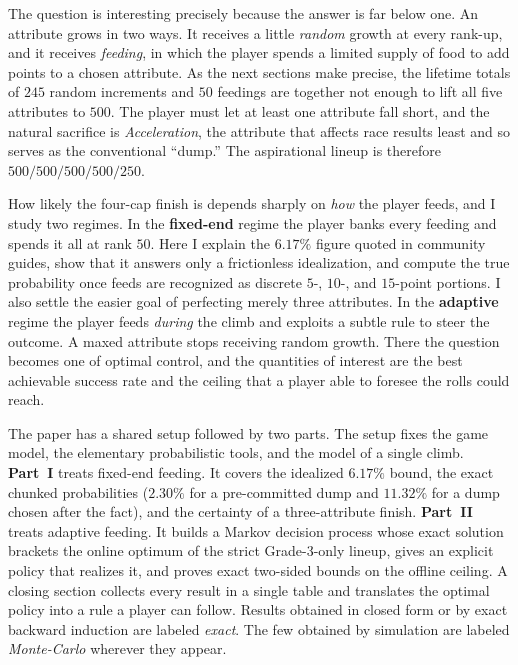 \documentclass[11pt]{article}
\theoremstyle{remark}
\begin{document}
The question is interesting precisely because the answer is far below one. An
attribute grows in two ways. It receives a little \emph{random} growth at every
rank-up, and it receives \emph{feeding}, in which the player spends a limited supply
of food to add points to a chosen attribute. As the next sections make precise, the
lifetime totals of $245$ random increments and $50$ feedings are together not enough
to lift all five attributes to $500$. The player must let at least one attribute
fall short, and the natural sacrifice is \emph{Acceleration}, the attribute that
affects race results least and so serves as the conventional ``dump.'' The
aspirational lineup is therefore $500/500/500/500/250$.

How likely the four-cap finish is depends sharply on \emph{how} the player feeds,
and I study two regimes. In the \textbf{fixed-end} regime the player banks every
feeding and spends it all at rank $50$. Here I explain the $6.17\%$ figure quoted
in community guides, show that it answers only a frictionless idealization, and
compute the true probability once feeds are recognized as discrete $5$-, $10$-, and
$15$-point portions. I also settle the easier goal of perfecting merely three
attributes. In the \textbf{adaptive} regime the player feeds \emph{during} the
climb and exploits a subtle rule to steer the outcome. A maxed attribute stops
receiving random growth. There the question becomes one of optimal control, and the
quantities of interest are the best achievable success rate and the ceiling that a
player able to foresee the rolls could reach.

The paper has a shared setup followed by two parts. The setup fixes the game model,
the elementary probabilistic tools, and the model of a single climb. \textbf{Part~I}
treats fixed-end feeding. It covers the idealized $6.17\%$ bound, the exact chunked
probabilities ($2.30\%$ for a pre-committed dump and $11.32\%$ for a dump chosen
after the fact), and the certainty of a three-attribute finish. \textbf{Part~II}
treats adaptive feeding. It builds a Markov decision process whose exact solution
brackets the online optimum of the strict Grade-3-only lineup, gives an explicit
policy that realizes it, and proves exact two-sided bounds on the offline ceiling. A
closing section collects every result in a single table and translates the optimal
policy into a rule a player can follow. Results obtained in closed form or by exact
backward induction are labeled \emph{exact}. The few obtained by simulation are
labeled \emph{Monte-Carlo} wherever they appear.
\end{document}
